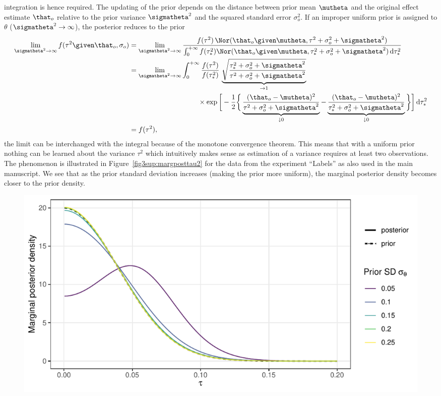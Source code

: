 \begin{subappendices}
integration is hence required. The updating of the prior depends on the distance
between prior mean $\mutheta$ and the original effect estimate $\that_{o}$
relative to the prior variance $\sigmatheta^{2}$ and the squared standard error
$\sigma_{o}^{2}$. If an improper uniform prior is assigned to $\theta$
($\sigmatheta^{2} \to \infty$), the posterior reduces to the prior
\begin{align*}
  \lim_{\sigmatheta^{2} \to \infty} f(\tau^{2} \given \that_{o}, \sigma_{o})
  &= \lim_{\sigmatheta^{2} \to \infty} \frac{f(\tau^{2}) \, \Nor(\that_{o} \given \mutheta, \tau^{2}
    + \sigma^{2}_{o} + \sigmatheta^{2})
    }{\int_{0}^{+\infty} f(\tau^{2}_{*})
    \Nor(\that_{o} \given \mutheta, \tau^{2}_{*} + \sigma^{2}_{o} + \sigmatheta^{2}) \,
    \text{d}\tau^{2}_{*}} \\
  &= \lim_{\sigmatheta^{2} \to \infty}  \int_{0}^{+\infty} \frac{f(\tau^{2})}{f(\tau^{2}_{*})} \,
    \underbrace{\sqrt{\frac{\tau^{2}_{*} + \sigma^{2}_{o} + \sigmatheta^{2}}{\tau^{2} + \sigma^{2}_{o} +
    \sigmatheta^{2}}}}_{\to 1} \\
  &\phantom{= \lim_{\sigmatheta^{2} \to \infty}  \int_{0}^{+\infty}} \times \exp\bigg[-\frac{1}{2}\bigg\{\underbrace{
    \frac{(\that_{o} - \mutheta)^{2}}{\tau^{2} + \sigma^{2}_{o} + \sigmatheta^{2}}}_{\downarrow 0} -
    \underbrace{\frac{(\that_{o} - \mutheta)^{2}}{\tau^{2}_{*} + \sigma^{2}_{o} +
    \sigmatheta^{2}}}_{\downarrow 0} \bigg\}\bigg] \, \text{d}\tau^{2}_{*} \\
  &= f(\tau^{2}),
\end{align*}
the limit can be interchanged with the integral because of the monotone
convergence theorem. This means that with a uniform prior nothing can be learned
about the variance $\tau^{2}$ which intuitively makes sense as estimation of a
variance requires at least two observations. The phenomenon is illustrated in
Figure~\ref{fig3sup:margposttau2} for the data from the experiment ``Labels''
\citep{Protzko2020} as also used in the main manuscript. We see that as the
prior standard deviation increases (making the prior more uniform), the marginal
posterior density becomes closer to the prior density.
\begin{figure}[!htb]
\begin{knitrout}
\color{fgcolor}
\includegraphics[width=\maxwidth]{images/paper3/sup-tau-random-example-1}

\end{knitrout}
\end{figure}
\end{subappendices}
